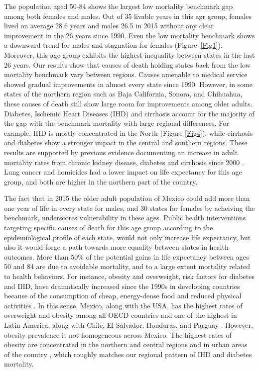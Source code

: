 \documentclass{bmcart}
\begin{document}
The population aged 50-84 shows the largest low mortality benchmark gap among both females and males. Out of 35 livable years in this agr group, females lived on average 28.6 years and males 26.5 in 2015 without any clear improvement in the 26 years since 1990. Even the low mortality benchmark shows a downward trend for males and stagnation for females (Figure~\ref{Fig1}). Moreover, this age group exhibits the highest inequality between states in the last 26 years. Our results show that causes of death holding states back from the low mortality benchmark vary between regions. Causes amenable to medical service showed gradual improvements in almost every state since 1990. However, in some states of the northern region such as Baja California, Sonora, and Chihuahua, these causes of death still show large room for improvements among older adults. Diabetes, Ischemic Heart Diseases (IHD) and cirrhosis account for the majority of the gap with the benchmark mortality with large regional differences. For example, IHD is mostly concentrated in the North (Figure \ref{Fig4}), while cirrhosis and diabetes show a stronger impact in the central and southern regions. These results are supported by previous evidence documenting an increase in adult mortality rates from chronic kidney disease, diabetes and cirrhosis since 2000 \cite{gomez2016dissonant}. Lung cancer and homicides had a lower impact on life expectancy for this age group, and both are higher in the northern part of the country. 

The fact that in 2015 the older adult population of Mexico could add more than one year of life in every state for males, and 30 states for females by acheiving the benchmark, underscores vulnerability in these ages. Public health interventions targeting specific causes of death for this age group according to the epidemiological profile of each state, would not only increase life expectancy, but also it would forge a path towards more equality between states in health outcomes. More than 50\% of the potential gains in life expectancy between ages 50 and 84 are due to avoidable mortality, and to a large extent mortality related to health behaviors. For instance, obesity and overweight, risk factors for diabetes and IHD, have dramatically increased since the 1990s in developing countries because of the consumption of cheap, energy-dense food and reduced physical activities \cite{hossain2007obesity}. In this sense, Mexico, along with the USA, has the highest rates of overweight and obesity among all OECD countries  \cite{gonzalez2016mexico} and one of the highest in Latin America, along with Chile, El Salvador, Honduras, and Parguay \cite{aschner2016obesity}. However, obesity prevalence is not homogeneous across Mexico. The highest rates of obesity are concentrated in the northern and central regions \cite{gonzalez2016mexico} and in urban areas of the country \cite{kuri2009prevalence}, which roughly matches our regional pattern of IHD and diabetes mortality.
\end{document}
